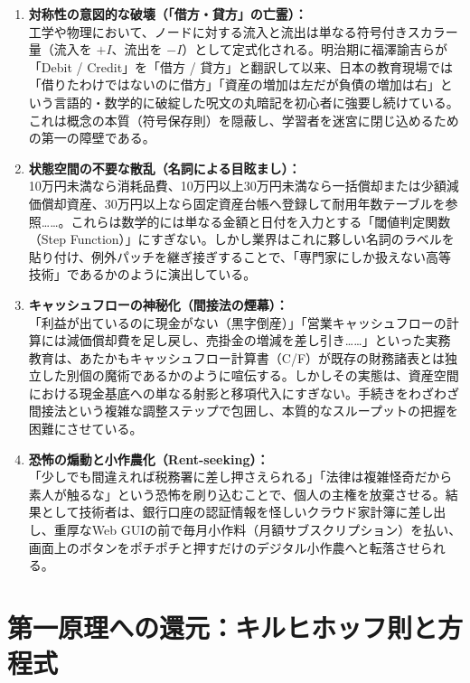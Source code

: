 \documentclass[11pt, a4paper]{report}
\begin{document}
\begin{enumerate}
    \item \textbf{対称性の意図的な破壊（「借方・貸方」の亡霊）：}\\
    工学や物理において、ノードに対する流入と流出は単なる符号付きスカラー量（流入を $+I$、流出を $-I$）として定式化される。明治期に福澤諭吉らが「Debit / Credit」を「借方 / 貸方」と翻訳して以来、日本の教育現場では「借りたわけではないのに借方」「資産の増加は左だが負債の増加は右」という言語的・数学的に破綻した呪文の丸暗記を初心者に強要し続けている。これは概念の本質（符号保存則）を隠蔽し、学習者を迷宮に閉じ込めるための第一の障壁である。

    \item \textbf{状態空間の不要な散乱（名詞による目眩まし）：}\\
    10万円未満なら消耗品費、10万円以上30万円未満なら一括償却または少額減価償却資産、30万円以上なら固定資産台帳へ登録して耐用年数テーブルを参照……。これらは数学的には単なる金額と日付を入力とする「閾値判定関数（Step Function）」にすぎない。しかし業界はこれに夥しい名詞のラベルを貼り付け、例外パッチを継ぎ接ぎすることで、「専門家にしか扱えない高等技術」であるかのように演出している。

    \item \textbf{キャッシュフローの神秘化（間接法の煙幕）：}\\
    「利益が出ているのに現金がない（黒字倒産）」「営業キャッシュフローの計算には減価償却費を足し戻し、売掛金の増減を差し引き……」といった実務教育は、あたかもキャッシュフロー計算書（C/F）が既存の財務諸表とは独立した別個の魔術であるかのように喧伝する。しかしその実態は、資産空間における現金基底への単なる射影と移項代入にすぎない。手続きをわざわざ間接法という複雑な調整ステップで包囲し、本質的なスループットの把握を困難にさせている。

    \item \textbf{恐怖の煽動と小作農化（Rent-seeking）：}\\
    「少しでも間違えれば税務署に差し押さえられる」「法律は複雑怪奇だから素人が触るな」という恐怖を刷り込むことで、個人の主権を放棄させる。結果として技術者は、銀行口座の認証情報を怪しいクラウド家計簿に差し出し、重厚なWeb GUIの前で毎月小作料（月額サブスクリプション）を払い、画面上のボタンをポチポチと押すだけのデジタル小作農へと転落させられる。
\end{enumerate}

\section{第一原理への還元：キルヒホッフ則と方程式}
\end{document}
